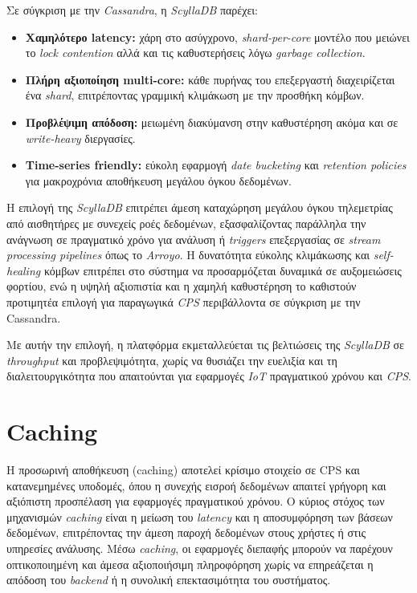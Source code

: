 Σε σύγκριση με την \textit{Cassandra}, η \textit{ScyllaDB} παρέχει:

\begin{itemize}
	\item \textbf{Χαμηλότερο latency:} χάρη στο ασύγχρονο,
	      \textit{shard-per-core} μοντέλο που μειώνει το \textit{lock
		      contention} αλλά και τις καθυστερήσεις λόγω \textit{garbage
		      collection}.
	\item \textbf{Πλήρη αξιοποίηση multi-core:} κάθε πυρήνας του
	      επεξεργαστή διαχειρίζεται ένα \textit{shard}, επιτρέποντας
	      γραμμική κλιμάκωση με την προσθήκη κόμβων.
	\item \textbf{Προβλέψιμη απόδοση:} μειωμένη διακύμανση στην καθυστέρηση
	      ακόμα και σε \textit{write-heavy} διεργασίες.
	\item \textbf{Time-series friendly:} εύκολη εφαρμογή \textit{date bucketing} και
	      \textit{retention policies} για μακροχρόνια αποθήκευση μεγάλου όγκου
	      δεδομένων.
\end{itemize}

Η επιλογή της \textit{ScyllaDB} επιτρέπει άμεση καταχώρηση μεγάλου όγκου
τηλεμετρίας από αισθητήρες με συνεχείς ροές δεδομένων, εξασφαλίζοντας παράλληλα
την ανάγνωση σε πραγματικό χρόνο για ανάλυση ή \textit{triggers} επεξεργασίας
σε \textit{stream processing pipelines} όπως το \textit{Arroyo}. Η δυνατότητα
εύκολης κλιμάκωσης και \textit{self-healing} κόμβων επιτρέπει στο σύστημα να
προσαρμόζεται δυναμικά σε αυξομειώσεις φορτίου, ενώ η υψηλή αξιοπιστία και η
χαμηλή καθυστέρηση το καθιστούν προτιμητέα επιλογή για παραγωγικά \textit{CPS}
περιβάλλοντα σε σύγκριση με την Cassandra.

Με αυτήν την επιλογή, η πλατφόρμα εκμεταλλεύεται τις βελτιώσεις της
\textit{ScyllaDB} σε \textit{throughput} και προβλεψιμότητα, χωρίς να θυσιάζει
την ευελιξία και τη διαλειτουργικότητα που απαιτούνται για εφαρμογές
\textit{IoT} πραγματικού χρόνου και \textit{CPS}.

\section{Caching}

Η προσωρινή αποθήκευση (caching) αποτελεί κρίσιμο στοιχείο σε CPS και
κατανεμημένες υποδομές, όπου η συνεχής εισροή δεδομένων απαιτεί γρήγορη και
αξιόπιστη προσπέλαση για εφαρμογές πραγματικού χρόνου. Ο κύριος στόχος των
μηχανισμών \textit{caching} είναι η μείωση του \textit{latency} και η
αποσυμφόρηση των βάσεων δεδομένων, επιτρέποντας την άμεση παροχή δεδομένων
στους χρήστες ή στις υπηρεσίες ανάλυσης. Μέσω \textit{caching}, οι εφαρμογές
διεπαφής μπορούν να παρέχουν οπτικοποιημένη και άμεσα αξιοποιήσιμη πληροφόρηση
χωρίς να επηρεάζεται η απόδοση του \textit{backend} ή η συνολική επεκτασιμότητα
του συστήματος.

